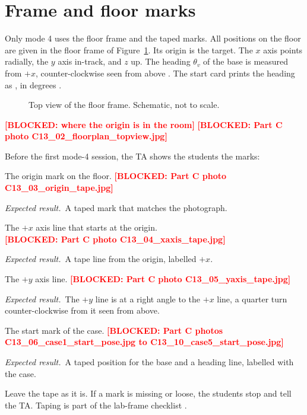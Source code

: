 \documentclass[11pt]{article}
\newcommand{\todo}[1]{\textcolor{red}{\textbf{[#1]}}}
\newcommand{\out}[1]{\texttt{\romecode{#1}}}
\newif\ifshowsrc
\newcommand{\src}[1]{\ifshowsrc{\scriptsize\,[\texttt{\romecode{#1}}]}\fi}
\newcommand{\expect}{\par\textit{Expected result.}\ }
\begin{document}
\section{Frame and floor marks}\label{sec:frame}
Only mode 4 uses the floor frame and the taped marks. All positions on the floor are given in the floor frame of
Figure~\ref{fig:frame}. Its origin is
the target. The $x$ axis points radially, the $y$ axis in-track, and $z$ up. The heading
$\theta_v$ of the base is measured from $+x$, counter-clockwise seen from above
\src{lab_settings.m:40-42}. The start card prints the heading as
\out{yaw}, in degrees \src{define_constants.m:321-322}.

\begin{figure}[h]
  \centering
  
  \caption{Top view of the floor frame. Schematic, not to scale.}
  \label{fig:frame}
\end{figure}

\todo{BLOCKED: where the origin is in the room}
\todo{BLOCKED: Part C photo C13\_02\_floorplan\_topview.jpg}

Before the first mode-4 session, the TA shows the students the marks:
\begin{steps}
  \item The origin mark on the floor.
  \todo{BLOCKED: Part C photo C13\_03\_origin\_tape.jpg}
  \expect A taped mark that matches the photograph.
  \item The $+x$ axis line that starts at the origin.\\
  \todo{BLOCKED: Part C photo C13\_04\_xaxis\_tape.jpg}
  \expect A tape line from the origin, labelled $+x$.
  \item The $+y$ axis line.
  \todo{BLOCKED: Part C photo C13\_05\_yaxis\_tape.jpg}
  \expect The $+y$ line is at a right angle to the $+x$ line, a quarter turn counter-clockwise
  from it seen from above.
  \item The start mark of the case.
  \todo{BLOCKED: Part C photos C13\_06\_case1\_start\_pose.jpg to C13\_10\_case5\_start\_pose.jpg}
  \expect A taped position for the base and a heading line, labelled with the case.
  \item Leave the tape as it is. If a mark is missing or loose, the students stop and tell the TA. Taping is
  part of the lab-frame checklist \src{docs/lab/PART_C_LAB_VISIT.md:179-194}.
\end{steps}
\end{document}
